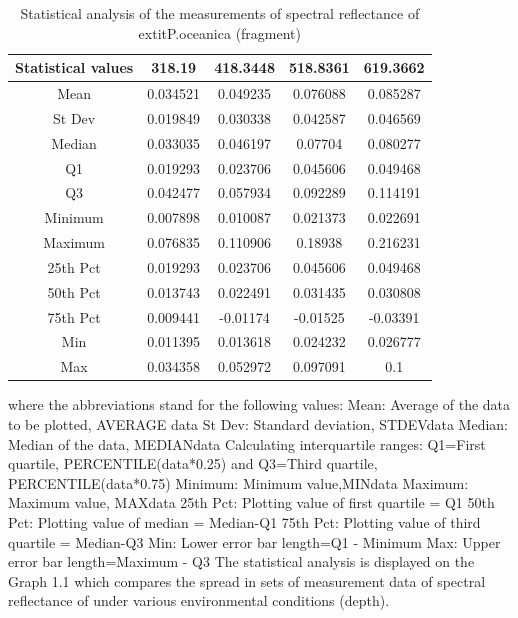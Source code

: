 \documentclass[10pt, a4paper]{article}
\begin{document}
\begin{table}
\caption{Statistical analysis of the measurements of spectral reflectance of 	extit{P.oceanica} (fragment)}
\centering
  \begin{tabular}{| c | c | c | c | c |}
    \hline
   	 \textbf{Statistical values} & \textbf{318.19} & \textbf{418.3448} & \textbf{518.8361} & \textbf{619.3662} \\ \hline \hline
	    Mean & 0.034521 & 0.049235 & 0.076088 & 0.085287 \\ \hline
	    St Dev & 0.019849 & 0.030338 & 0.042587 & 0.046569 \\ \hline
	   Median & 0.033035 & 0.046197 & 0.07704 & 0.080277 \\ \hline
	   Q1 & 0.019293 & 0.023706 & 0.045606& 0.049468 \\ \hline
	   Q3 & 0.042477 & 0.057934 & 0.092289 & 0.114191 \\ \hline
	   Minimum & 0.007898 & 0.010087 & 0.021373 & 0.022691 \\ \hline
	   Maximum & 0.076835 & 0.110906 & 0.18938 & 0.216231 \\ \hline
	   25th Pct & 0.019293 & 0.023706 & 0.045606 & 0.049468 \\ \hline
	   50th Pct & 0.013743 & 0.022491 & 0.031435 & 0.030808 \\ \hline
	   75th Pct & 0.009441 & -0.01174 & -0.01525 & -0.03391 \\ \hline
	   Min & 0.011395 & 0.013618 & 0.024232 & 0.026777 \\ \hline
	   Max & 0.034358 & 0.052972 & 0.097091 & 0.1 \\ \hline
  \end{tabular}
   \label{tab:4}
\end{table}

where the abbreviations stand for the following values:
Mean: Average of the data to be plotted, AVERAGE {data}
St Dev: Standard deviation, STDEV{data}
Median: Median of the data, MEDIAN{data}
Calculating interquartile ranges: Q1=First quartile, PERCENTILE({data}*0.25) and Q3=Third
quartile, PERCENTILE({data}*0.75)
Minimum: Minimum value,MIN{data}
Maximum: Maximum value, MAX{data}
25th Pct: Plotting value of first quartile = Q1
50th Pct: Plotting value of median = Median-Q1
75th Pct: Plotting value of third quartile = Median-Q3
Min: Lower error bar length=Q1 - Minimum
Max: Upper error bar length=Maximum - Q3
The statistical analysis is displayed on the Graph 1.1 which compares the spread in sets of
measurement data of spectral reflectance of under various environmental conditions (depth).
\end{document}
